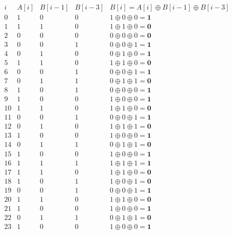 \documentclass{article}
\begin{document}
\[
\begin{array}{|c|c|c|c|c|}
\hline
i & A[i] & B[i-1] & B[i-3] & B[i] = A[i] \oplus B[i-1] \oplus B[i-3] \\
\hline
0 & 1 & 0 & 0 & 1 \oplus 0 \oplus 0 = \mathbf{1} \\
1 & 1 & 1 & 0 & 1 \oplus 1 \oplus 0 = \mathbf{0} \\
2 & 0 & 0 & 0 & 0 \oplus 0 \oplus 0 = \mathbf{0} \\
3 & 0 & 0 & 1 & 0 \oplus 0 \oplus 1 = \mathbf{1} \\

4 & 0 & 1 & 0 & 0 \oplus 1 \oplus 0 = \mathbf{1} \\
5 & 1 & 1 & 0 & 1 \oplus 1 \oplus 0 = \mathbf{0} \\
6 & 0 & 0 & 1 & 0 \oplus 0 \oplus 1 = \mathbf{1} \\
7 & 0 & 1 & 1 & 0 \oplus 1 \oplus 1 = \mathbf{0} \\

8 & 1 & 0 & 1 & 0 \oplus 0 \oplus 0 = \mathbf{1} \\ 
9 & 1 & 0 & 0 & 1 \oplus 0 \oplus 0 = \mathbf{1} \\
10 & 1 & 1 & 0 & 1 \oplus 1 \oplus 0 = \mathbf{0} \\
11 & 0 & 0 & 1 & 0 \oplus 0 \oplus 1 = \mathbf{1} \\

12 & 0 & 1 & 0 & 1 \oplus 1 \oplus 1 = \mathbf{0} \\
13 & 1 & 0 & 0 & 1 \oplus 0 \oplus 0 = \mathbf{1} \\
14 & 0 & 1 & 1 & 0 \oplus 1 \oplus 1 = \mathbf{0} \\
15 & 1 & 0 & 0 & 1 \oplus 0 \oplus 0 = \mathbf{1} \\

16 & 1 & 1 & 1 & 1 \oplus 1 \oplus 1 = \mathbf{1} \\
17 & 1 & 1 & 0 & 1 \oplus 1 \oplus 0 = \mathbf{0} \\
18 & 1 & 0 & 1 & 1 \oplus 0 \oplus 1 = \mathbf{0} \\
19 & 0 & 0 & 1 & 0 \oplus 0 \oplus 1 = \mathbf{1} \\

20 & 1 & 1 & 0 & 1 \oplus 1 \oplus 0 = \mathbf{0} \\
21 & 1 & 0 & 0 & 1 \oplus 0 \oplus 0 = \mathbf{1} \\
22 & 0 & 1 & 1 & 0 \oplus 1 \oplus 1 = \mathbf{0} \\
23 & 1 & 0 & 0 & 1 \oplus 0 \oplus 0 = \mathbf{1} \\


\end{array}\]
\end{document}
